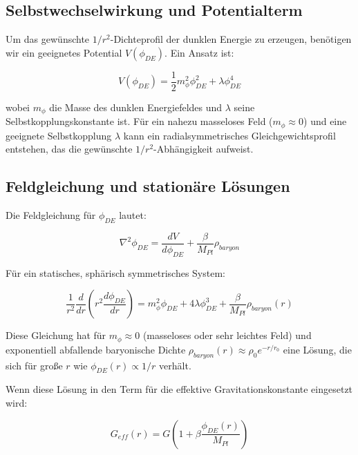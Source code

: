 \documentclass[a4paper,12pt]{article}
\begin{document}
	\subsection{Selbstwechselwirkung und Potentialterm}
	
	Um das gewünschte $1/r^2$-Dichteprofil der dunklen Energie zu erzeugen, benötigen wir ein geeignetes Potential $V(\phi_{DE})$. Ein Ansatz ist:
	
	\begin{equation}
		V(\phi_{DE}) = \frac{1}{2}m_{\phi}^2\phi_{DE}^2 + \lambda \phi_{DE}^4
	\end{equation}
	
	wobei $m_{\phi}$ die Masse des dunklen Energiefeldes und $\lambda$ seine Selbstkopplungskonstante ist. Für ein nahezu masseloses Feld ($m_{\phi} \approx 0$) und eine geeignete Selbstkopplung $\lambda$ kann ein radialsymmetrisches Gleichgewichtsprofil entstehen, das die gewünschte $1/r^2$-Abhängigkeit aufweist.
	
	\subsection{Feldgleichung und stationäre Lösungen}
	
	Die Feldgleichung für $\phi_{DE}$ lautet:
	
	\begin{equation}
		\nabla^2 \phi_{DE} = \frac{dV}{d\phi_{DE}} + \frac{\beta}{M_{Pl}}\rho_{baryon}
	\end{equation}
	
	Für ein statisches, sphärisch symmetrisches System:
	
	\begin{equation}
		\frac{1}{r^2}\frac{d}{dr}\left(r^2\frac{d\phi_{DE}}{dr}\right) = m_{\phi}^2\phi_{DE} + 4\lambda\phi_{DE}^3 + \frac{\beta}{M_{Pl}}\rho_{baryon}(r)
	\end{equation}
	
	Diese Gleichung hat für $m_{\phi} \approx 0$ (masseloses oder sehr leichtes Feld) und exponentiell abfallende baryonische Dichte $\rho_{baryon}(r) \approx \rho_0 e^{-r/r_0}$ eine Lösung, die sich für große $r$ wie $\phi_{DE}(r) \propto 1/r$ verhält. 
	
	Wenn diese Lösung in den Term für die effektive Gravitationskonstante eingesetzt wird:
	
	\begin{equation}
		G_{eff}(r) = G\left(1 + \beta\frac{\phi_{DE}(r)}{M_{Pl}}\right)
	\end{equation}
	
\end{document}
